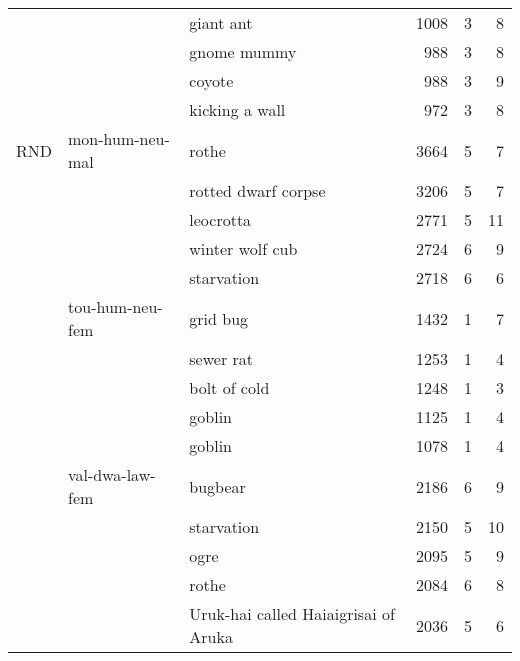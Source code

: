 \documentclass{article}
\begin{document}
\begin{table}
{\begin{tabular}{lllrrr}
   &   &                             giant ant &   1008 &                 3 &              8 \\
   &   &                           gnome mummy &    988 &                 3 &              8 \\
   &   &                                coyote &    988 &                 3 &              9 \\
   &   &                        kicking a wall &    972 &                 3 &              8 \\
\midrule
  RND &  mon-hum-neu-mal &                                 rothe &   3664 &                 5 &              7 \\
   &   &                   rotted dwarf corpse &   3206 &                 5 &              7 \\
   &   &                             leocrotta &   2771 &                 5 &             11 \\
   &   &                       winter wolf cub &   2724 &                 6 &              9 \\
   &   &                            starvation &   2718 &                 6 &              6 \\
   \cmidrule{2-6}
   &  tou-hum-neu-fem &                              grid bug &   1432 &                 1 &              7 \\
   &   &                             sewer rat &   1253 &                 1 &              4 \\
   &   &                          bolt of cold &   1248 &                 1 &              3 \\
   &   &                                goblin &   1125 &                 1 &              4 \\
   &   &                                goblin &   1078 &                 1 &              4 \\
   \cmidrule{2-6}
   &  val-dwa-law-fem &                               bugbear &   2186 &                 6 &              9 \\
   &   &                            starvation &   2150 &                 5 &             10 \\
   &   &                                  ogre &   2095 &                 5 &              9 \\
   &   &                                 rothe &   2084 &                 6 &              8 \\
   &   &  Uruk-hai called Haiaigrisai of Aruka &   2036 &                 5 &              6 \\

\end{tabular}}
\end{table}
\end{document}
